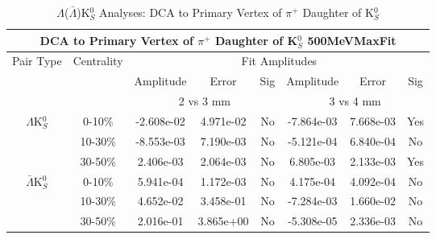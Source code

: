 \documentclass[../AnalysisNoteJBuxton.tex]{subfiles}
\begin{document}
\begin{table}
 \centering
 \begin{tabular}{|c|c|c|c|c||c|c|c|}
  \multicolumn{8}{c}{DCA to Primary Vertex of $\pi^{+}$ Daughter of K$^{0}_{S}$ 500MeVMaxFit} \\
  \hline
  \multirow{3}{*}{Pair Type} & \multirow{3}{*}{Centrality} & \multicolumn{6}{c|}{Fit Amplitudes} \\
  \cline{3-8}
   & & Amplitude & Error & Sig & Amplitude & Error & Sig \\  
  \cline{3-8}
   & & \multicolumn{3}{c||}{2 vs 3 mm} & \multicolumn{3}{c|}{3 vs 4 mm} \\  
  \hline  
  \multirow{3}{*}{$\Lambda$K$^{0}_{S}$}  
   &  0-10\% & -2.608e-02 & 4.971e-02 & No & -7.864e-03 & 7.668e-03 & Yes \\
   & 10-30\% & -8.553e-03 & 7.190e-03 & No & -5.121e-04 & 6.840e-04 & No \\
   & 30-50\% & 2.406e-03 & 2.064e-03 & No & 6.805e-03 & 2.133e-03 & Yes \\
  \hline  
  \multirow{3}{*}{$\bar{\Lambda}$K$^{0}_{S}$}  
   &  0-10\% & 5.941e-04 & 1.172e-03 & No & 4.175e-04 & 4.092e-04 & No \\
   & 10-30\% & 4.652e-02 & 3.458e-01 & No & -7.284e-03 & 1.660e-02 & No \\
   & 30-50\% & 2.016e-01 & 3.865e+00 & No & -5.308e-05 & 2.336e-03 & No \\
  \hline
 \end{tabular}
 \caption{$\Lambda$($\bar{\Lambda}$)K$^{0}_{S}$ Analyses: DCA to Primary Vertex of $\pi^{+}$ Daughter of K$^{0}_{S}$}
 \label{tab:DcaToPrimVertexPosPionDaughtOfK0LamK0_500MeVMaxFit}
\end{table}
\end{document}

